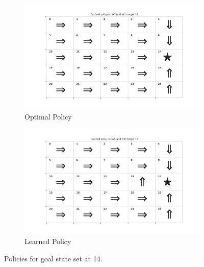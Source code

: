 \begin{figure}[!htbp]
    \centering
    \begin{subfigure}[b]{0.49\linewidth}
        \centering
        \includegraphics[width=\linewidth]{experimentation/images/Optimal policy in 5x5 grid with target 14.png}
        \caption{Optimal Policy}
    \end{subfigure}
    \begin{subfigure}[b]{0.49\linewidth}
        \centering
        \includegraphics[width=\linewidth]{experimentation/images/Learned policy in 5x5 grid with target 14.png}
        \caption{Learned Policy}
    \end{subfigure}
    \caption{Policies for goal state set at 14.}
    \label{fig:policy_14}
\end{figure}

